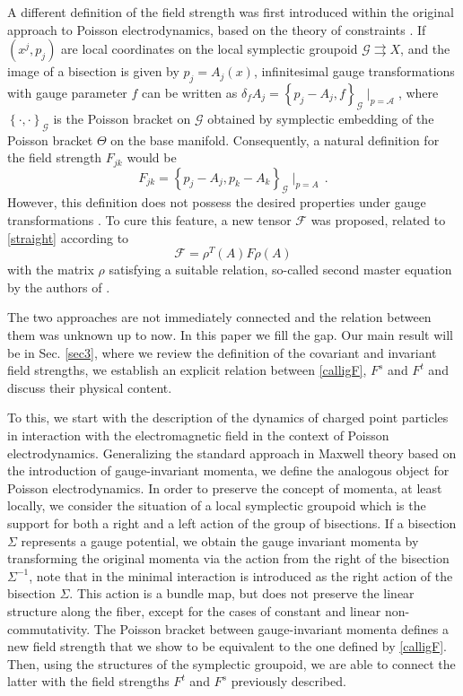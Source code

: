 \documentclass[12pt,a4paper]{article}
\numberwithin{equation}{section}
\theoremstyle{definition}
\newcommand{\cG}{\mathcal{G}}
\newcommand{\be}{\begin{equation}}
\newcommand{\ee}{\end{equation}}
\newcommand{\eqn}{\eqref}
\begin{document}
A different definition of the field strength was first introduced within the original approach to Poisson electrodynamics,  based on the theory of constraints \cite{Kupriyanov:2021aet,Kupriyanov:2022ohu}. If $(x^j,p_j)$ are local coordinates on the local symplectic groupoid $\cG \rightrightarrows X$, and the image of a bisection is given by $p_j={A}_j(x)$, infinitesimal gauge transformations with gauge parameter $f$ can be written as $\delta_f {A}_j = \left\lbrace p_j - {A}_j, f \right\rbrace_{\cG}\mid_{p=\mathcal{A}}$, where  $\left\lbrace  \cdot , \cdot \right\rbrace_{\cG}$ is the Poisson bracket on $\cG$ obtained by symplectic embedding of the Poisson bracket $\Theta$ on the base manifold. Consequently, a natural definition for the field strength $F_{jk}$ would be
\be
F_{jk} = \left\lbrace p_j-{A}_j , p_k - {A}_k \right\rbrace_{\cG}\mid_{p=A}\,.
\label{straight} 
\ee
However, this definition does not possess the desired properties under gauge transformations \cite{Kupriyanov:2022ohu}. To cure this feature, a new tensor $\mathcal{F}$ was proposed, related to \eqn{straight} according to 
\be
\mathcal{F}=\rho^T(A)F\rho(A) \label{calligF}
\ee 
with the matrix $\rho$ satisfying a suitable relation, so-called second master equation by the authors of \cite{Kupriyanov:2022ohu}.

The two approaches are not immediately connected and the relation between them was unknown up to now. In this paper we  fill the gap. Our main result will be  in Sec. \ref{sec3}, where we review the definition of the covariant and invariant field strengths, we establish an explicit relation between \eqn{calligF}, $F^s$ and $F^t$ and discuss their physical content. 

To this,  we start with  the description of the dynamics of charged point particles in interaction with the electromagnetic field  in the context of Poisson electrodynamics. Generalizing the standard approach in Maxwell theory based on the introduction of gauge-invariant momenta, we define the analogous object for Poisson electrodynamics. In order to preserve the  concept of momenta, at least locally, we consider the situation of a local symplectic groupoid which is the support for both a right and a left action of the group of bisections. If a bisection $\Sigma$ represents a gauge potential,  we obtain the gauge invariant momenta by transforming the original momenta via the action from the right of the bisection $\Sigma^{-1}$, note that in \cite{Kupriyanov:2023qot} the minimal interaction is introduced as the right action of the bisection $\Sigma$. This action is a bundle map, but does not preserve the linear structure along the fiber, except for the cases of constant and linear non-commutativity. The Poisson bracket between gauge-invariant momenta defines a new field strength  that we show to be  equivalent to the one defined by \eqn{calligF}. Then, using  the structures of the symplectic groupoid, we are able to connect the latter with the field strengths $F^t$ and $F^s$ previously described. 
\end{document}
